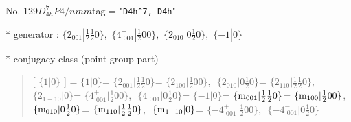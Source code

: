 \documentclass[fleqn,10pt,landscape]{jsarticle}
\begin{document}
\newpage

No. 129\quad$D_{4h}^{7}$\quad$P4/nmm$\quad[ tetragonal ]
tag = "{\tt D4h^7, D4h}"

* generator : $\{2{}_{001}|\frac{1}{2} \frac{1}{2} 0\},\,\,\{4^{+}_{\,\,001}|\frac{1}{2} 0 0\},\,\,\{2{}_{010}|0 \frac{1}{2} 0\},\,\,\{-1|0\}$

* conjugacy class (point-group part)
\begin{quote}
[ $\{1|0\}$ ] = \quad $\{1|0\}$ = \quad $\{2{}_{001}|\frac{1}{2} \frac{1}{2} 0\}$\newline[ $\{2{}_{100}|\frac{1}{2} 0 0\}$ ] = \quad $\{2{}_{100}|\frac{1}{2} 0 0\}$,\,\, $\{2{}_{010}|0 \frac{1}{2} 0\}$ = \quad $\{2{}_{110}|\frac{1}{2} \frac{1}{2} 0\}$,\,\, $\{2{}_{1-10}|0\}$\newline[ $\{4^{+}_{\,\,001}|\frac{1}{2} 0 0\}$ ] = \quad $\{4^{+}_{\,\,001}|\frac{1}{2} 0 0\}$,\,\, $\{4^{-}_{\,\,001}|0 \frac{1}{2} 0\}$\newline[ $\{-1|0\}$ ] = \quad $\{-1|0\}$ = \quad $\{{\rm m}_{001}|\frac{1}{2} \frac{1}{2} 0\}$\newline[ $\{{\rm m}_{100}|\frac{1}{2} 0 0\}$ ] = \quad $\{{\rm m}_{100}|\frac{1}{2} 0 0\}$,\,\, $\{{\rm m}_{010}|0 \frac{1}{2} 0\}$ = \quad $\{{\rm m}_{110}|\frac{1}{2} \frac{1}{2} 0\}$,\,\, $\{{\rm m}_{1-10}|0\}$\newline[ $\{-4^{+}_{\,\,001}|\frac{1}{2} 0 0\}$ ] = \quad $\{-4^{+}_{\,\,001}|\frac{1}{2} 0 0\}$,\,\, $\{-4^{-}_{\,\,001}|0 \frac{1}{2} 0\}$\newline
\end{quote}
\end{document}
